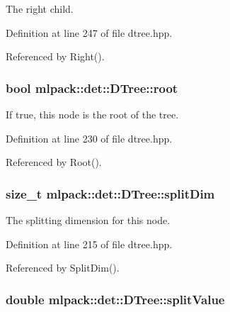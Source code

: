 The right child. 



Definition at line 247 of file dtree.\-hpp.



Referenced by Right().

\subsubsection[{root}]{\setlength{\rightskip}{0pt plus 5cm}bool mlpack\-::det\-::\-D\-Tree\-::root\hspace{0.3cm}{\ttfamily [private]}}\label{classmlpack_1_1det_1_1DTree_a8ba42f670ef753878df9f2e697473b05}


If true, this node is the root of the tree. 



Definition at line 230 of file dtree.\-hpp.



Referenced by Root().

\subsubsection[{split\-Dim}]{\setlength{\rightskip}{0pt plus 5cm}size\-\_\-t mlpack\-::det\-::\-D\-Tree\-::split\-Dim\hspace{0.3cm}{\ttfamily [private]}}\label{classmlpack_1_1det_1_1DTree_acb3d8ba06ad9128d65bd52d7b6a586c9}


The splitting dimension for this node. 



Definition at line 215 of file dtree.\-hpp.



Referenced by Split\-Dim().

\subsubsection[{split\-Value}]{\setlength{\rightskip}{0pt plus 5cm}double mlpack\-::det\-::\-D\-Tree\-::split\-Value\hspace{0.3cm}{\ttfamily [private]}}\label{classmlpack_1_1det_1_1DTree_ae2b715ebbc645a0f66037af903eb9575}



